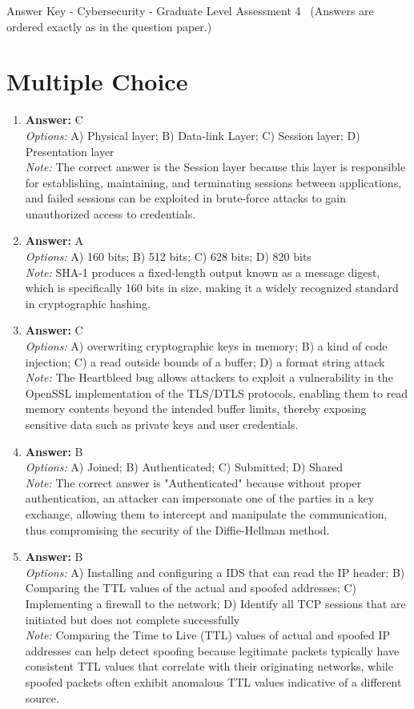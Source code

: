 \documentclass[12pt]{article}
\begin{document}
\begin{center}
Answer Key - Cybersecurity - Graduate Level Assessment 4 \
\small (Answers are ordered exactly as in the question paper.)
\end{center}

\section*{Multiple Choice}
\begin{enumerate}[label=\arabic*.]
\item \textbf{Answer:} C
\\ \textit{Options:} A) Physical layer; B) Data-link Layer; C) Session layer; D) Presentation layer
\\ \textit{Note:} The correct answer is the Session layer because this layer is responsible for establishing, maintaining, and terminating sessions between applications, and failed sessions can be exploited in brute-force attacks to gain unauthorized access to credentials.
\item \textbf{Answer:} A
\\ \textit{Options:} A) 160 bits; B) 512 bits; C) 628 bits; D) 820 bits
\\ \textit{Note:} SHA-1 produces a fixed-length output known as a message digest, which is specifically 160 bits in size, making it a widely recognized standard in cryptographic hashing.
\item \textbf{Answer:} C
\\ \textit{Options:} A) overwriting cryptographic keys in memory; B) a kind of code injection; C) a read outside bounds of a buffer; D) a format string attack
\\ \textit{Note:} The Heartbleed bug allows attackers to exploit a vulnerability in the OpenSSL implementation of the TLS/DTLS protocols, enabling them to read memory contents beyond the intended buffer limits, thereby exposing sensitive data such as private keys and user credentials.
\item \textbf{Answer:} B
\\ \textit{Options:} A) Joined; B) Authenticated; C) Submitted; D) Shared
\\ \textit{Note:} The correct answer is "Authenticated" because without proper authentication, an attacker can impersonate one of the parties in a key exchange, allowing them to intercept and manipulate the communication, thus compromising the security of the Diffie-Hellman method.
\item \textbf{Answer:} B
\\ \textit{Options:} A) Installing and configuring a IDS that can read the IP header; B) Comparing the TTL values of the actual and spoofed addresses; C) Implementing a firewall to the network; D) Identify all TCP sessions that are initiated but does not complete successfully
\\ \textit{Note:} Comparing the Time to Live (TTL) values of actual and spoofed IP addresses can help detect spoofing because legitimate packets typically have consistent TTL values that correlate with their originating networks, while spoofed packets often exhibit anomalous TTL values indicative of a different source.
\end{enumerate}
\end{document}
